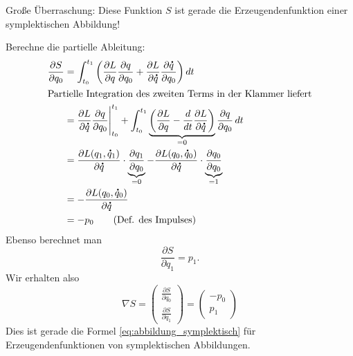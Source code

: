 \documentclass[german]{scrreprt}
\theoremstyle{plain}
\theoremstyle{nonumberplain}
\theoremstyle{nonumberplain}
\theoremstyle{nonumberplain}
\renewcommand*{\dot}[1]{\accentset{\mbox{\large\bfseries .}}{#1}}
\begin{document}

\renewcommand*\contentsname{\huge \centering Optimierung \& Numerik --- Vorlesung 19}
\tableofcontents


\setcounter{chapter}{12}
\setcounter{section}{5}
\setcounter{satz}{8}
\setcounter{lemma}{1}
\setcounter{equation}{4}

Große Überraschung: Diese Funktion $S$ ist gerade die Erzeugendenfunktion einer symplektischen Abbildung!

Berechne die partielle Ableitung:
\begin{align*}
\frac{\partial S}{\partial q_0}
& =
\int_{t_0}^{t_1} \bigg( \frac{\partial L}{\partial q} \frac{\partial q}{\partial q_0} + \frac{\partial L}{\partial \dot q}\frac{\partial\dot q}{\partial q_0}\bigg)\,dt \\
%
\intertext{Partielle Integration des zweiten Terms in der Klammer liefert}
&=
\frac{\partial L}{\partial \dot q}\frac{\partial q}{\partial q_0}\Bigg\vert_{t_0}^{t_1} + \int_{t_0}^{t_1} \underbrace{\bigg( \frac{\partial L}{\partial q}  - \frac{d}{dt} \frac{\partial L}{\partial \dot q}\bigg)}_{=0} \frac{\partial q}{\partial q_0}\,dt \\
&= \frac{\partial L(q_1,\dot q_1)}{\partial \dot q} \cdot \underbrace{\frac{\partial q_1}{\partial q_0}}_{=0}  - \frac{\partial L(q_0,\dot q_0)}{\partial \dot q} \cdot \underbrace{\frac{\partial q_0}{\partial q_0}}_{=1}  \\
&= - \frac{\partial L(q_0,\dot q_0)}{\partial \dot q} \\
&= -p_0 \tag{Def. des Impulses}
\end{align*}
Ebenso berechnet man
\begin{equation*}
\frac{\partial S}{\partial q_1} = p_1.
\end{equation*}
Wir erhalten also
\begin{equation}
\nabla S =
\begin{pmatrix}
\frac{\partial S}{\partial q_0}  \\
\frac{\partial S}{\partial q_1}
\end{pmatrix}
=
\begin{pmatrix}
-p_0 \\ p_1
\end{pmatrix}
\end{equation}
Dies ist gerade die Formel \eqref{eq:abbildung_symplektisch} für Erzeugendenfunktionen von symplektischen Abbildungen.
\end{document}
